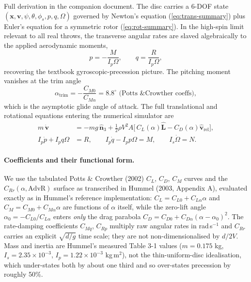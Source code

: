 \documentclass[11pt,letterpaper]{article}
\begin{document}
Full derivation in the companion document. The disc carries a 6-DOF state $(\mathbf{x}, \mathbf{v}, \psi, \theta, \phi_s, p, q, \Omega)$ governed by Newton's equation (\ref{eq:trans-summary}) plus Euler's equation for a symmetric rotor (\ref{eq:rot-summary}). In the high-spin limit relevant to all real throws, the transverse angular rates are slaved algebraically to the applied aerodynamic moments,
\begin{equation}
p = -\frac{M}{I_p \Omega}, \qquad q = \frac{R}{I_p \Omega},
\end{equation}
recovering the textbook gyroscopic-precession picture. The pitching moment vanishes at the trim angle
\begin{equation}
\alpha_{\text{trim}} = -\frac{C_{M0}}{C_{M\alpha}} = 8.8^\circ \text{ (Potts \& Crowther coeffs)},
\label{eq:alphatrim}
\end{equation}
which is the asymptotic glide angle of attack. The full translational and rotational equations entering the numerical simulator are
\begin{align}
m\,\dot{\mathbf{v}} &= -mg\,\hat{\mathbf{n}}_3 + \tfrac{1}{2}\rho V^2 A\big[\,C_L(\alpha)\hat{\mathbf{L}} - C_D(\alpha)\hat{\mathbf{v}}_{\text{rel}}\big], \label{eq:trans-summary}\\
I_p \dot{p} + I_p q \Omega &= R,\qquad I_p \dot{q} - I_p p \Omega = M,\qquad I_s \dot{\Omega} = N. \label{eq:rot-summary}
\end{align}

\paragraph{Coefficients and their functional form.} We use the tabulated
Potts \& Crowther (2002) $C_L$, $C_D$, $C_M$ curves and the
$C_{Rr}(\alpha, \text{AdvR})$ surface as transcribed in Hummel (2003,
Appendix A), evaluated exactly as in Hummel's reference implementation:
$C_L = C_{L0} + C_{L\alpha}\alpha$ and $C_M = C_{M0} + C_{M\alpha}\alpha$ are
functions of $\alpha$ itself, while the zero-lift angle
$\alpha_0 = -C_{L0}/C_{L\alpha}$ enters \emph{only} the drag parabola
$C_D = C_{D0} + C_{D\alpha}(\alpha - \alpha_0)^2$. The rate-damping
coefficients $C_{Mq}$, $C_{Rp}$ multiply raw angular rates in rad\,s$^{-1}$ and
$C_{Rr}$ carries an explicit $\sqrt{d/g}$ time scale; they are not
non-dimensionalised by $d/2V$. Mass and inertia are Hummel's measured Table 3-1
values ($m = 0.175$ kg, $I_s = 2.35\times10^{-3}$, $I_p = 1.22\times10^{-3}$
kg\,m$^2$), not the thin-uniform-disc idealisation, which under-states both by
about one third and so over-states precession by roughly 50\%.
\end{document}
